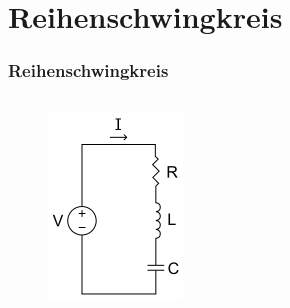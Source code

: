 \section*{Reihen\-schwing\-kreis}
\begin{frame}
  \frametitle{Reihenschwingkreis}
  \begin{columns}
    \begin{figure}
      \includegraphics[width=\textwidth,height=.4\textheight,keepaspectratio]{e07/Serirenschw.png}
    \end{figure}
    \begin{figure}

\end{figure}
\end{columns}
\end{frame}

